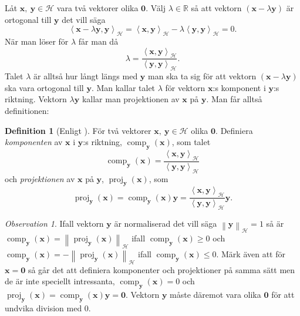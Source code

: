 \documentclass[a4paper, 12pt]{report}
\theoremstyle{definition}
\newtheorem{defi}{Definition}[section]
\theoremstyle{remark}
\newtheorem*{rem}{Observation}
\newcommand{\bfx}{\mathbf{x}}
\newcommand{\bfy}{\mathbf{y}}
\newcommand{\llangle}{\left\langle}
\newcommand{\rrangle}{\right\rangle}
\newcommand{\inner}[2]{\llangle #1, #2 \rrangle}
\newcommand{\hil}{\mathcal{H}}
\begin{document}
Låt $\bfx,~\bfy\in\hil$ vara två vektorer olika $\mathbf{0}$. Välj $\lambda\in\mathbb{R}$ så att vektorn $\left(\bfx-\lambda\bfy \right)$ är ortogonal till $\bfy$ det vill säga
\begin{equation*}
	\inner{\bfx-\lambda\bfy}{\bfy}_\hil=\inner{\bfx}{\bfy}_\hil-\lambda\inner{\bfy}{\bfy}_\hil=0.
\end{equation*}
När man löser för $\lambda$ får man då
\begin{equation*}
	\lambda=\frac{\inner{\bfx}{\bfy}_\hil}{\inner{\bfy}{\bfy}_\hil}.
\end{equation*}
Talet $\lambda$ är alltså hur långt längs med $\bfy$ man ska ta sig för att vektorn $\left(\bfx-\lambda\bfy\right)$ ska vara ortogonal till $\bfy$.
Man kallar talet $\lambda$ för vektorn $\bfx$:s komponent i $\bfy$:s riktning.
Vektorn $\lambda\bfy$ kallar man projektionen av $\bfx$ på $\bfy$.
Man får alltså definitionen:
\begin{defi}[Enligt \cite{Lang}]
	För två vektorer $\bfx,~\bfy\in\mathcal{H}$ olika $\mathbf{0}$. Definiera \emph{komponenten} av $\bfx$ i $\bfy$:s riktning, $\operatorname{comp}_\bfy\left(\bfx\right)$, som talet  
	\begin{equation*}
		\operatorname{comp}_\bfy\left(\bfx\right)=\frac{\inner{\bfx}{\bfy}_\hil}{\inner{\bfy}{\bfy}_\hil}
	\end{equation*}
	och \emph{projektionen} av $\bfx$ på $\bfy$, $\operatorname{proj}_\bfy\left(\bfx\right)$, som
	\begin{equation*}
		\operatorname{proj}_\bfy\left(\bfx\right)=\operatorname{comp}_\bfy\left(\bfx\right)\bfy=\frac{\inner{\bfx}{\bfy}_\hil}{\inner{\bfy}{\bfy}_\hil}\bfy.
	\end{equation*}
\end{defi}
\begin{rem}
	Ifall vektorn $\bfy$ är normaliserad det vill säga $\left\|\bfy\right\|_\hil=1$ så är $\operatorname{comp}_\bfy\left(\bfx\right)=\left\|\operatorname{proj}_\bfy\left(\bfx\right)\right\|_\hil$ ifall $\operatorname{comp}_\bfy\left(\bfx\right)\geq0$ och $\operatorname{comp}_\bfy\left(\bfx\right)=-\left\|\operatorname{proj}_\bfy\left(\bfx\right)\right\|_\hil$ ifall $\operatorname{comp}_\bfy\left(\bfx\right)\leq0$.
	Märk även att för $\bfx=\mathbf{0}$ så går det att definiera komponenter och projektioner på samma sätt men de är inte speciellt intressanta, $\operatorname{comp}_\bfy\left(\bfx\right)=0$ och $\operatorname{proj}_\bfy\left(\bfx\right)=\operatorname{comp}_\bfy\left(\bfx\right)\bfy=\mathbf{0}$.
	Vektorn $\bfy$ måste däremot vara olika $\mathbf{0}$ för att undvika division med 0.
\end{rem}
\end{document}
